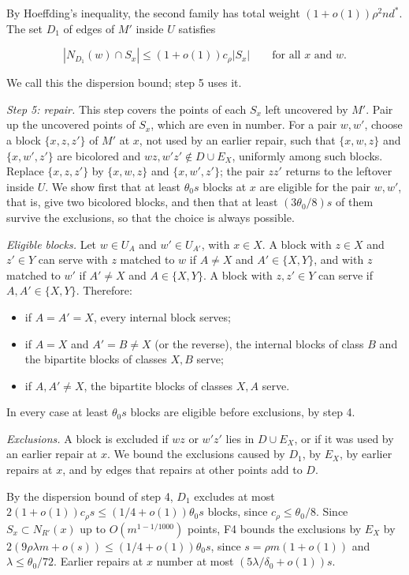 \documentclass[english,11pt,a4paper]{article}
\providecommand{\tightlist}{\setlength{\itemsep}{0pt}\setlength{\parskip}{0pt}}
\begin{document}
By Hoeffding's inequality, the second family has total weight \((1+o(1))\rho^2nd^*\). The set \(D_1\) of edges of \(M'\) inside \(U\) satisfies

\nopagebreak[4]
\[|N_{D_1}(w)\cap S_x|\le(1+o(1))c_\rho|S_x|\qquad\text{for all }x\text{ and }w.\]

We call this the dispersion bound; step 5 uses it.

\emph{Step 5: repair.} This step covers the points of each \(S_x\) left uncovered by \(M'\). Pair up the uncovered points of \(S_x\), which are even in number. For a pair \(w,w'\), choose a block \(\{x,z,z'\}\) of \(M'\) at \(x\), not used by an earlier repair, such that \(\{x,w,z\}\) and \(\{x,w',z'\}\) are bicolored and \(wz,w'z'\notin D\cup E_X\), uniformly among such blocks. Replace \(\{x,z,z'\}\) by \(\{x,w,z\}\) and \(\{x,w',z'\}\); the pair \(zz'\) returns to the leftover inside \(U\). We show first that at least \(\theta_0s\) blocks at \(x\) are eligible for the pair \(w,w'\), that is, give two bicolored blocks, and then that at least \((3\theta_0/8)s\) of them survive the exclusions, so that the choice is always possible.

\emph{Eligible blocks.} Let \(w\in U_A\) and \(w'\in U_{A'}\), with \(x\in X\). A block with \(z\in X\) and \(z'\in Y\) can serve with \(z\) matched to \(w\) if \(A\ne X\) and \(A'\in\{X,Y\}\), and with \(z\) matched to \(w'\) if \(A'\ne X\) and \(A\in\{X,Y\}\). A block with \(z,z'\in Y\) can serve if \(A,A'\in\{X,Y\}\). Therefore:

\begin{itemize}
\tightlist
\item
  if \(A=A'=X\), every internal block serves;
\item
  if \(A=X\) and \(A'=B\ne X\) (or the reverse), the internal blocks of class \(B\) and the bipartite blocks of classes \(X,B\) serve;
\item
  if \(A,A'\ne X\), the bipartite blocks of classes \(X,A\) serve.
\end{itemize}

In every case at least \(\theta_0s\) blocks are eligible before exclusions, by step 4.

\emph{Exclusions.} A block is excluded if \(wz\) or \(w'z'\) lies in \(D\cup E_X\), or if it was used by an earlier repair at \(x\). We bound the exclusions caused by \(D_1\), by \(E_X\), by earlier repairs at \(x\), and by edges that repairs at other points add to \(D\).

By the dispersion bound of step 4, \(D_1\) excludes at most \(2(1+o(1))c_\rho s\le(1/4+o(1))\theta_0s\) blocks, since \(c_\rho\le\theta_0/8\). Since \(S_x\subset N_{R'}(x)\) up to \(O(m^{1-1/1000})\) points, F4 bounds the exclusions by \(E_X\) by \(2(9\rho\lambda m+o(s))\le(1/4+o(1))\theta_0s\), since \(s=\rho m(1+o(1))\) and \(\lambda\le\theta_0/72\). Earlier repairs at \(x\) number at most \((5\lambda/\delta_0+o(1))s\).
\end{document}
